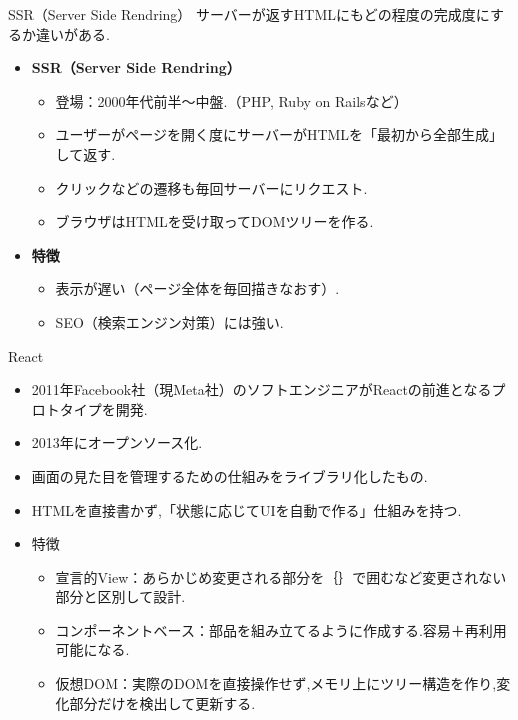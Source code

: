 \documentclass[aspectratio=169]{beamer}
\begin{document}
\begin{frame}{SSR（Server Side Rendring）}
    サーバーが返すHTMLにもどの程度の完成度にするか違いがある.\\
    \begin{itemize}
        \setlength{\parskip}{1em}
        \item \textbf{SSR（Server Side Rendring）}
        \begin{itemize}
            \setlength{\parskip}{1em}
            \item 登場：2000年代前半～中盤.（PHP, Ruby on Railsなど）
            \item ユーザーがページを開く度にサーバーがHTMLを「最初から全部生成」して返す.
            \item クリックなどの遷移も毎回サーバーにリクエスト.
            \item ブラウザはHTMLを受け取ってDOMツリーを作る.
        \end{itemize}
        \item \textbf{特徴}
        \begin{itemize}
            \setlength{\parskip}{1em}
            \item 表示が遅い（ページ全体を毎回描きなおす）.
            \item SEO（検索エンジン対策）には強い.
        \end{itemize}
    \end{itemize}
\end{frame}

\begin{frame}{React}
    \begin{itemize}
        \setlength{\parskip}{1em}
        \item 2011年Facebook社（現Meta社）のソフトエンジニアがReactの前進となるプロトタイプを開発.
        \item 2013年にオープンソース化.
        \item 画面の見た目を管理するための仕組みをライブラリ化したもの.
        \item HTMLを直接書かず,「状態に応じてUIを自動で作る」仕組みを持つ.
        \item 特徴
        \begin{itemize}
            \setlength{\parskip}{1em}
            \item 宣言的View：あらかじめ変更される部分を｛｝で囲むなど変更されない部分と区別して設計.
            \item コンポーネントベース：部品を組み立てるように作成する.容易＋再利用可能になる.
            \item 仮想DOM：実際のDOMを直接操作せず,メモリ上にツリー構造を作り,変化部分だけを検出して更新する.
        \end{itemize}
    \end{itemize}    
\end{frame}
\end{document}

